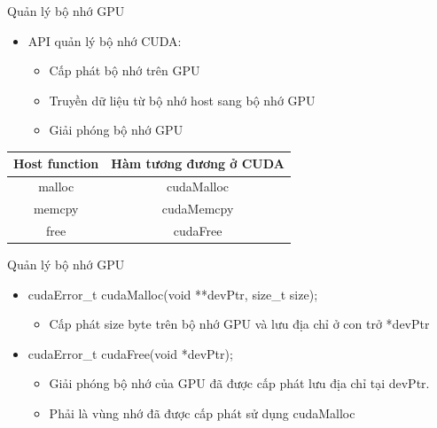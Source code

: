 \documentclass[10pt]{beamer}
\theoremstyle{remark}
\numberwithin{algocf}{section}
\numberwithin{equation}{section}
\numberwithin{dl}{section}
\numberwithin{figure}{section}
\begin{document}
\begin{frame}{Quản lý bộ nhớ GPU}
    \begin{itemize}
        \item API quản lý bộ nhớ CUDA:
        \begin{itemize}
            \item Cấp phát bộ nhớ trên GPU
            \item Truyền dữ liệu từ bộ nhớ host sang bộ nhớ GPU
            \item Giải phóng bộ nhớ GPU
        \end{itemize}
    \end{itemize}
    \begin{table}[H]
        \centering
        \begin{tabular}{|c|c|}
            \hline
            Host function & Hàm tương đương ở CUDA \\
            \hline
            malloc & cudaMalloc \\
            \hline
            memcpy & cudaMemcpy \\
            \hline
            free & cudaFree \\
            \hline
        \end{tabular}
    \end{table}
\end{frame}

\begin{frame}{Quản lý bộ nhớ GPU}
    \begin{itemize}
        \item cudaError\_t cudaMalloc(void **devPtr, size\_t size);
        \begin{itemize}
            \item Cấp phát size byte trên bộ nhớ GPU và lưu địa chỉ ở con trở *devPtr
        \end{itemize}
        \item cudaError\_t cudaFree(void *devPtr);
        \begin{itemize}
            \item Giải phóng bộ nhớ của GPU đã được cấp phát lưu địa chỉ tại devPtr.
            \item Phải là vùng nhớ đã được cấp phát sử dụng cudaMalloc
        \end{itemize}
        
    \end{itemize}
\end{frame}
\end{document}

